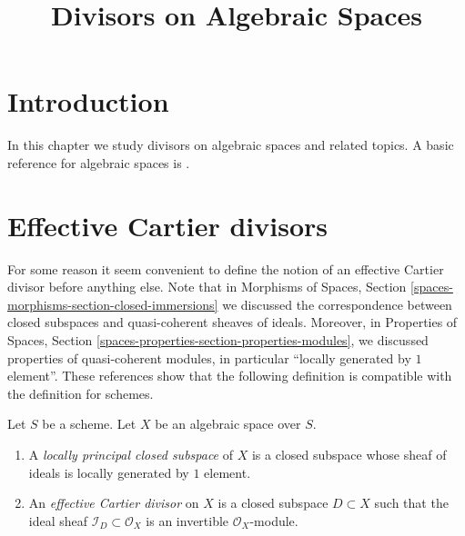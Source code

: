 

%


\title{Divisors on Algebraic Spaces}


\maketitle

\label{section-phantom}

\tableofcontents

\section{Introduction}
\label{section-introduction}

\noindent
In this chapter we study divisors on algebraic spaces and related topics.
A basic reference for algebraic spaces is \cite{Kn}.




\section{Effective Cartier divisors}
\label{section-effective-Cartier-divisors}

\noindent
For some reason it seem convenient to define the notion of an effective
Cartier divisor before anything else. Note that in
Morphisms of Spaces, Section \ref{spaces-morphisms-section-closed-immersions}
we discussed the correspondence between closed subspaces and quasi-coherent
sheaves of ideals. Moreover, in
Properties of Spaces, Section
\ref{spaces-properties-section-properties-modules}, we discussed properties
of quasi-coherent modules, in particular ``locally generated by $1$ element''.
These references show that the following definition is
compatible with the definition for schemes.

\begin{definition}
\label{definition-effective-Cartier-divisor}
Let $S$ be a scheme. Let $X$ be an algebraic space over $S$.
\begin{enumerate}
\item A {\it locally principal closed subspace} of $X$ is a closed subspace
whose sheaf of ideals is locally generated by $1$ element.
\item An {\it effective Cartier divisor} on $X$ is a closed subspace
$D \subset X$ such that the ideal sheaf $\mathcal{I}_D \subset \mathcal{O}_X$
is an invertible $\mathcal{O}_X$-module.
\end{enumerate}
\end{definition}

